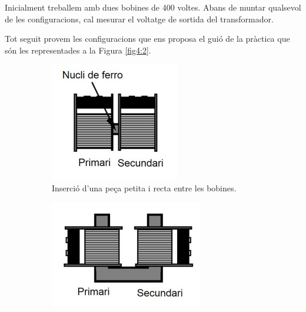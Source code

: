 \documentclass[a4paper,10.5pt]{report}
\begin{document}
Inicialment treballem amb dues bobines de 400 voltes. Abans de muntar qualsevol de les configuracions, cal mesurar el voltatge de sortida del transformador.

Tot seguit provem les configuracions que ens proposa el guió de la pràctica que són les representades a la Figura \ref{fig4:2}.

\begin{figure}[h]
	\centering
	\begin{subfigure}[b]{0.22\textwidth}
		\centering
		\includegraphics[width=\textwidth]{42a.jpg}
		\caption{Inserció d'una peça petita i recta entre les bobines.}
		\label{fig4:2a}
	\end{subfigure}
	\hspace{0.4cm}
	\begin{subfigure}[b]{0.22\textwidth}
		\centering
		\includegraphics[width=\textwidth]{42b.jpg}

\end{subfigure}
\end{figure}
\end{document}
